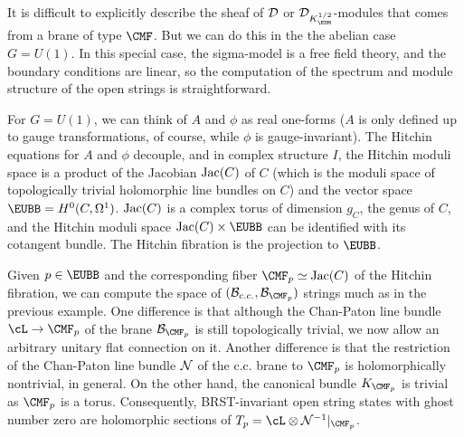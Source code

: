 It is difficult to explicitly describe the sheaf of ${\cal D}$ or
${\cal D}_{K_{ \EUM}^{1/2}}$-modules that comes from a brane of
type $\CMF$. But we can do this in the the abelian case $G=U(1)$.
In this special case, the sigma-model is a free field theory, and
the boundary conditions are linear, so the computation of the
spectrum and module structure of the open strings is
straightforward.

For $G=U(1)$, we can think of $A$ and $\phi$ as real one-forms
($A$ is only defined up to gauge transformations, of course, while
$\phi$ is gauge-invariant).  The Hitchin equations for $A$ and
$\phi$ decouple, and in complex structure $I$, the Hitchin moduli
space is a product of the Jacobian ${\rm Jac}(C)$ of $C$ (which is
the moduli space of topologically trivial holomorphic line bundles
on $C$) and the vector space ${\EUBB}=H^0(C,\Omega^1)$. ${\rm
Jac}(C)$ is a complex torus of dimension $g_C$, the genus of $C$,
and the Hitchin moduli space ${\rm Jac}(C)\times {\EUBB}$ can be
identified with its cotangent bundle. The Hitchin fibration is the
projection to ${\EUBB}$.

Given $p\in {\EUBB}$ and the corresponding fiber ${\CMF}_p\simeq
{\rm Jac}(C)$ of the Hitchin fibration, we can compute the space
of $({\cal B}_{c.c.},{\cal B}_{{\CMF}_p})$ strings much as in the
previous example. One difference is that although the Chan-Paton
line bundle $\cL\to{\CMF}_p$ of the brane ${\cal B}_{{\CMF}_p}$ is
still topologically trivial, we now allow an arbitrary unitary
flat connection on it. Another difference is that the restriction
of the Chan-Paton line bundle ${\cal N}$ of the c.c. brane to
${\CMF}_p$ is holomorphically nontrivial, in general. On the other
hand, the canonical bundle $K_{{\CMF}_p}$ is trivial as ${\CMF}_p$
is a torus. Consequently, BRST-invariant open string states with
ghost number zero are holomorphic sections of $T_p=\cL\otimes
{\cal N}^{-1}\vert_{{\CMF}_p}$.

